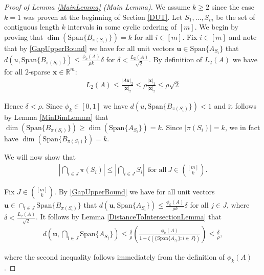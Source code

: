 \documentclass[journal, onecolumn]{IEEEtran}
\begin{document}
\begin{proof}[Proof of Lemma \ref{MainLemma} (Main Lemma)]
We assume $k \geq 2$ since the case $k = 1$ was proven at the beginning of Section \ref{DUT}. Let $S_1, \ldots, S_m$ be the set of contiguous length $k$ intervals in some cyclic ordering of $[m]$. We begin by proving that $\dim(\text{Span}\{B_{\pi(S_i)}\}) = k$ for all $i \in [m]$. 
Fix $i \in [m]$ and note that by \eqref{GapUpperBound} we have for all unit vectors $\mathbf{u} \in \text{Span}\{A_{S_i}\}$ that $d(u, \text{Span}\{B_{\pi(S_i)}\}) \leq \frac{\phi_k(A)}{\rho k} \delta$ for $\delta < \frac{L_2(A)}{ \sqrt{2}}$. By definition of $L_2(A)$ we have for all $2$-sparse $\mathbf{x} \in \mathbb{R}^m$:
\begin{align}
L_2(A) \leq \frac{|A\mathbf{x}|_2}{|\mathbf{x}|_2} \leq \rho \frac{|\mathbf{x}|_1}{|\mathbf{x}|_2} \leq \rho \sqrt{2}
\end{align}

Hence $\delta < \rho$. Since $\phi_k \in [0,1]$ we have $d(u, \text{Span}\{B_{\pi(S_i)}\}) < 1$ and it follows by Lemma \ref{MinDimLemma} that $\dim(\text{Span}\{B_{\pi(S_i)}\}) \geq \dim(\text{Span}\{A_{S_i}\}) = k$. Since $|\pi(S_i)| = k$, we in fact have $\dim(\text{Span}\{B_{\pi(S_i)}\}) = k$. %

We will now show that
\begin{align}\label{fact2}
|\bigcap_{i \in J} \pi(S_i)| \leq |\bigcap_{i \in J} S_i | \ \ \text{for all} \ J \in {[m] \choose k}.
\end{align}

Fix $J \in {[m] \choose k}$. By \eqref{GapUpperBound} we have for all unit vectors $\mathbf{u} \in \cap_{i \in J} \text{Span}\{B_{\pi(S_i)}\}$ that $d(\mathbf{u}, \text{Span}\{A_{S_i}\}) \leq \frac{\phi_k(A)}{\rho k} \delta$ for all $j \in J$, where $\delta < \frac{L_2(A)}{\sqrt{2}}$. It follows by Lemma \ref{DistanceToIntersectionLemma} that
\begin{align*}
d\left( \mathbf{u}, \bigcap_{i \in J} \text{Span}\{A_{S_j}\} \right) 
\leq \frac{\delta}{\rho} \left( \frac{ \phi_k(A) }{1 - \xi( \{ \text{Span}\{A_{S_i}\}: i \in J\} ) } \right) \leq \frac{\delta}{\rho},
\end{align*}

where the second inequality follows immediately from the definition of $\phi_k(A)$. 


\end{proof}
\end{document}
